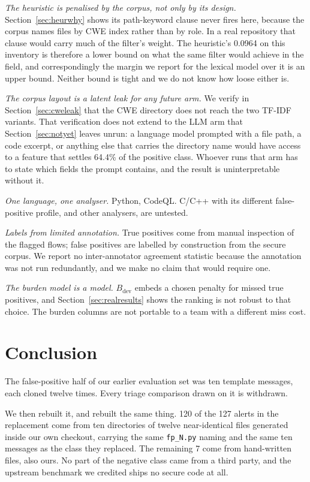 \documentclass[journal]{IEEEtran}
\theoremstyle{definition}
\newcommand{\RNfp}{127}
\newcommand{\CHeurFullMcc}{0.0964}
\newcommand{\CFpSecure}{120}
\newcommand{\CFpPatched}{7}
\newcommand{\DTpOnOnlyPct}{64.4}
\begin{document}
\emph{The heuristic is penalised by the corpus, not only by its design.}
Section~\ref{sec:heurwhy} shows its path-keyword clause never fires here,
because the corpus names files by CWE index rather than by role. In a real
repository that clause would carry much of the filter's weight. The heuristic's
\CHeurFullMcc{} on this inventory is therefore a lower bound on what the same
filter would achieve in the field, and correspondingly the margin we report for
the lexical model over it is an upper bound. Neither bound is tight and we do
not know how loose either is.

\emph{The corpus layout is a latent leak for any future arm.} We verify in
Section~\ref{sec:cweleak} that the CWE directory does not reach the two TF-IDF
variants. That verification does not extend to the LLM arm that
Section~\ref{sec:notyet} leaves unrun: a language model prompted with a file
path, a code excerpt, or anything else that carries the directory name would
have access to a feature that settles \DTpOnOnlyPct\% of the positive class.
Whoever runs that arm has to state which fields the prompt contains, and the
result is uninterpretable without it.

\emph{One language, one analyser.} Python, CodeQL. C/C++ with its different
false-positive profile, and other analysers, are untested.

\emph{Labels from limited annotation.} True positives come from manual
inspection of the flagged flows; false positives are labelled by construction
from the secure corpus. We report no inter-annotator agreement statistic because
the annotation was not run redundantly, and we make no claim that would require
one.

\emph{The burden model is a model.} $B_{\mathrm{dev}}$ embeds a chosen penalty
for missed true positives, and Section~\ref{sec:realresults} shows the ranking
is not robust to that choice. The burden columns are not portable to a team with
a different miss cost.

\section{Conclusion}
\label{sec:conclusion}

The false-positive half of our earlier evaluation set was ten template
messages, each cloned twelve times. Every triage comparison drawn on it is
withdrawn.

We then rebuilt it, and rebuilt the same thing. \CFpSecure{} of the \RNfp{}
alerts in the replacement come from ten directories of twelve near-identical
files generated inside our own checkout, carrying the same
\texttt{fp\_N.py} naming and the same ten messages as the class they replaced.
The remaining \CFpPatched{} come from hand-written files, also ours. No part of
the negative class came from a third party, and the upstream benchmark we
credited ships no secure code at all.
\end{document}
